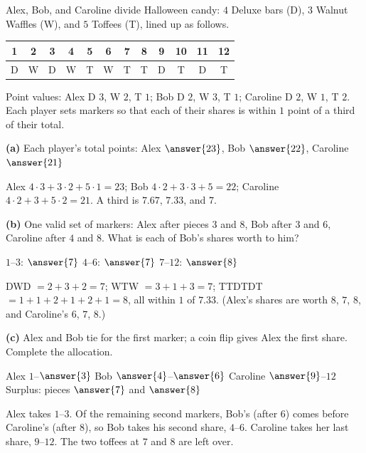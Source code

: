 \documentclass[12pt]{ximera}
\begin{document}
\begin{problem}
Alex, Bob, and Caroline divide Halloween candy: $4$ Deluxe bars (D), $3$ Walnut Waffles
(W), and $5$ Toffees (T), lined up as follows.
\begin{center}
\begin{tabular}{cccccccccccc}
1 & 2 & 3 & 4 & 5 & 6 & 7 & 8 & 9 & 10 & 11 & 12\\\hline
D & W & D & W & T & W & T & T & D & T & D & T
\end{tabular}
\end{center}
Point values: Alex D $3$, W $2$, T $1$; Bob D $2$, W $3$, T $1$; Caroline D $2$, W $1$,
T $2$. Each player sets markers so that each of their shares is within $1$ point of a third
of their total.

\begin{prompt}
\textbf{(a)} Each player's total points: Alex $\answer{23}$, Bob $\answer{22}$,
Caroline $\answer{21}$
\begin{feedback}
Alex $4\cdot3+3\cdot2+5\cdot1=23$; Bob $4\cdot2+3\cdot3+5=22$; Caroline
$4\cdot2+3+5\cdot2=21$. A third is $7.67$, $7.33$, and $7$.
\end{feedback}
\end{prompt}

\begin{prompt}
\textbf{(b)} One valid set of markers: Alex after pieces $3$ and $8$, Bob after $3$ and
$6$, Caroline after $4$ and $8$. What is each of Bob's shares worth to him?

$1$--$3$: $\answer{7}$ \quad $4$--$6$: $\answer{7}$ \quad $7$--$12$: $\answer{8}$
\begin{feedback}
DWD $=2+3+2=7$; WTW $=3+1+3=7$; TTDTDT $=1+1+2+1+2+1=8$, all within $1$ of $7.33$.
(Alex's shares are worth $8$, $7$, $8$, and Caroline's $6$, $7$, $8$.)
\end{feedback}
\end{prompt}

\begin{prompt}
\textbf{(c)} Alex and Bob tie for the first marker; a coin flip gives Alex the first
share. Complete the allocation.

Alex $1$--$\answer{3}$ \quad Bob $\answer{4}$--$\answer{6}$ \quad Caroline
$\answer{9}$--$12$ \qquad Surplus: pieces $\answer{7}$ and $\answer{8}$
\begin{feedback}
Alex takes $1$--$3$. Of the remaining second markers, Bob's (after $6$) comes before
Caroline's (after $8$), so Bob takes his second share, $4$--$6$. Caroline takes her last
share, $9$--$12$. The two toffees at $7$ and $8$ are left over.
\end{feedback}
\end{prompt}
\end{problem}
\end{document}
